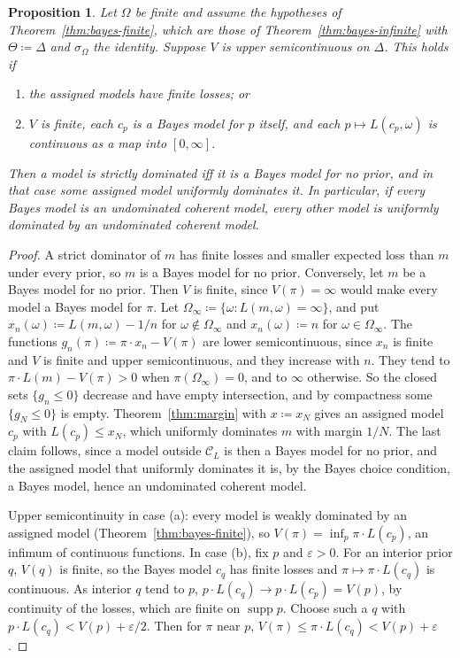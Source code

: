 \documentclass[11pt]{article}
\newtheorem{proposition}[theorem]{Proposition}
\theoremstyle{definition}
\theoremstyle{remark}
\newcommand{\C}{\mathcal C}
\newcommand{\supp}{\operatorname{supp}}
\begin{document}
\begin{proposition}\label{prop:strict}
Let $\Omega$ be finite and assume the hypotheses of Theorem~\ref{thm:bayes-finite}, which are those of Theorem~\ref{thm:bayes-infinite} with $\Theta\coloneqq\Delta$ and $\sigma_\Omega$ the identity. Suppose $V$ is upper semicontinuous on $\Delta$. This holds if
\begin{enumerate}[label=(\alph*)]
\item the assigned models have finite losses; or
\item $V$ is finite, each $c_p$ is a Bayes model for $p$ itself, and each $p\mapsto L(c_p,\omega)$ is continuous as a map into $[0,\infty]$.
\end{enumerate}
Then a model is strictly dominated iff it is a Bayes model for no prior, and in that case some assigned model uniformly dominates it. In particular, if every Bayes model is an undominated coherent model, every other model is uniformly dominated by an undominated coherent model.
\end{proposition}
\begin{proof}
A strict dominator of $m$ has finite losses and smaller expected loss than $m$ under every prior, so $m$ is a Bayes model for no prior. Conversely, let $m$ be a Bayes model for no prior. Then $V$ is finite, since $V(\pi)=\infty$ would make every model a Bayes model for $\pi$. Let $\Omega_\infty\coloneqq\{\omega:L(m,\omega)=\infty\}$, and put $x_n(\omega)\coloneqq L(m,\omega)-1/n$ for $\omega\notin\Omega_\infty$ and $x_n(\omega)\coloneqq n$ for $\omega\in\Omega_\infty$. The functions $g_n(\pi)\coloneqq\pi\cdot x_n-V(\pi)$ are lower semicontinuous, since $x_n$ is finite and $V$ is finite and upper semicontinuous, and they increase with $n$. They tend to $\pi\cdot L(m)-V(\pi)>0$ when $\pi(\Omega_\infty)=0$, and to $\infty$ otherwise. So the closed sets $\{g_n\le0\}$ decrease and have empty intersection, and by compactness some $\{g_N\le0\}$ is empty. Theorem~\ref{thm:margin} with $x\coloneqq x_N$ gives an assigned model $c_p$ with $L(c_p)\le x_N$, which uniformly dominates $m$ with margin $1/N$. The last claim follows, since a model outside $\C_L$ is then a Bayes model for no prior, and the assigned model that uniformly dominates it is, by the Bayes choice condition, a Bayes model, hence an undominated coherent model.

Upper semicontinuity in case (a): every model is weakly dominated by an assigned model (Theorem~\ref{thm:bayes-finite}), so $V(\pi)=\inf_p\pi\cdot L(c_p)$, an infimum of continuous functions. In case (b), fix $p$ and $\varepsilon>0$. For an interior prior $q$, $V(q)$ is finite, so the Bayes model $c_q$ has finite losses and $\pi\mapsto\pi\cdot L(c_q)$ is continuous. As interior $q$ tend to $p$, $p\cdot L(c_q)\to p\cdot L(c_p)=V(p)$, by continuity of the losses, which are finite on $\supp p$. Choose such a $q$ with $p\cdot L(c_q)<V(p)+\varepsilon/2$. Then for $\pi$ near $p$, $V(\pi)\le\pi\cdot L(c_q)<V(p)+\varepsilon$.
\end{proof}
\end{document}
